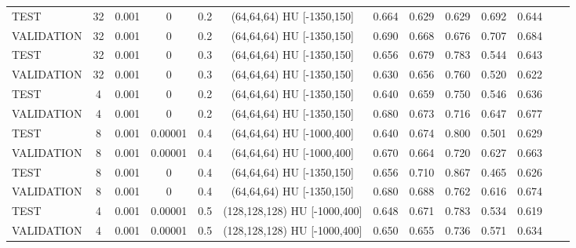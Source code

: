 \begin{table}[!htbp]
{\begin{tabular}{lcccccccccccc}
\midrule
TEST & 32 & 0.001 & 0 & 0.2 & (64,64,64) HU [-1350,150] & 0.664 & 0.629 & 0.629 & 0.692 & 0.644 \\
VALIDATION & 32 & 0.001 & 0 & 0.2 & (64,64,64) HU [-1350,150] & 0.690 & 0.668 & 0.676 & 0.707 & 0.684 \\
\midrule
TEST & 32 & 0.001 & 0 & 0.3 & (64,64,64) HU [-1350,150] & 0.656 & 0.679 & 0.783 & 0.544 & 0.643 \\
VALIDATION & 32 & 0.001 & 0 & 0.3 & (64,64,64) HU [-1350,150] & 0.630 & 0.656 & 0.760 & 0.520 & 0.622 \\
\midrule
TEST & 4 & 0.001 & 0 & 0.2 & (64,64,64) HU [-1350,150] & 0.640 & 0.659 & 0.750 & 0.546 & 0.636 \\
VALIDATION & 4 & 0.001 & 0 & 0.2 & (64,64,64) HU [-1350,150] & 0.680 & 0.673 & 0.716 & 0.647 & 0.677 \\
\midrule
TEST & 8 & 0.001 & 0.00001 & 0.4 & (64,64,64) HU [-1000,400] & 0.640 & 0.674 & 0.800 & 0.501 & 0.629 \\
VALIDATION & 8 & 0.001 & 0.00001 & 0.4 & (64,64,64) HU [-1000,400] & 0.670 & 0.664 & 0.720 & 0.627 & 0.663 \\
\midrule
TEST & 8 & 0.001 & 0 & 0.4 & (64,64,64) HU [-1350,150] & 0.656 & 0.710 & 0.867 & 0.465 & 0.626 \\
VALIDATION & 8 & 0.001 & 0 & 0.4 & (64,64,64) HU [-1350,150] & 0.680 & 0.688 & 0.762 & 0.616 & 0.674 \\

\midrule
TEST & 4 & 0.001 & 0.00001 & 0.5 & (128,128,128) HU [-1000,400] & 0.648 & 0.671 & 0.783 & 0.534 & 0.619 \\
VALIDATION & 4 & 0.001 & 0.00001 & 0.5 & (128,128,128) HU [-1000,400] & 0.650 & 0.655 & 0.736 & 0.571 & 0.634 \\
\midrule


\end{tabular}}
\end{table}

